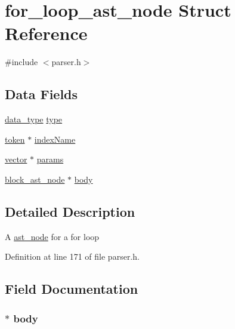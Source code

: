 \hypertarget{structfor__loop__ast__node}{\section{for\+\_\+loop\+\_\+ast\+\_\+node Struct Reference}
\label{structfor__loop__ast__node}
}


{\ttfamily \#include $<$parser.\+h$>$}

\subsection*{Data Fields}
\begin{DoxyCompactItemize}
\item 
\hyperlink{parser_8h_ac2ad7f431e3446fddcd9b6b9f93c4c14}{data\+\_\+type} \hyperlink{structfor__loop__ast__node_aa117a93354fa3056f51378be7065ce33}{type}
\item 
\hyperlink{structtoken}{token} $\ast$ \hyperlink{structfor__loop__ast__node_a4f446cf7b6976171f96394f7ac3254db}{index\+Name}
\item 
\hyperlink{structvector}{vector} $\ast$ \hyperlink{structfor__loop__ast__node_a25682f768036a8e8d6a3f34f59367049}{params}
\item 
\hyperlink{structblock__ast__node}{block\+\_\+ast\+\_\+node} $\ast$ \hyperlink{structfor__loop__ast__node_a8b3e0335ffa487088d6f3c5ea9424235}{body}
\end{DoxyCompactItemize}


\subsection{Detailed Description}
A \hyperlink{structast__node}{ast\+\_\+node} for a for loop 

Definition at line 171 of file parser.\+h.



\subsection{Field Documentation}
\hypertarget{structfor__loop__ast__node_a8b3e0335ffa487088d6f3c5ea9424235}{
\subsubsection[{body}]{$\ast$ body}}\label{structfor__loop__ast__node_a8b3e0335ffa487088d6f3c5ea9424235}


